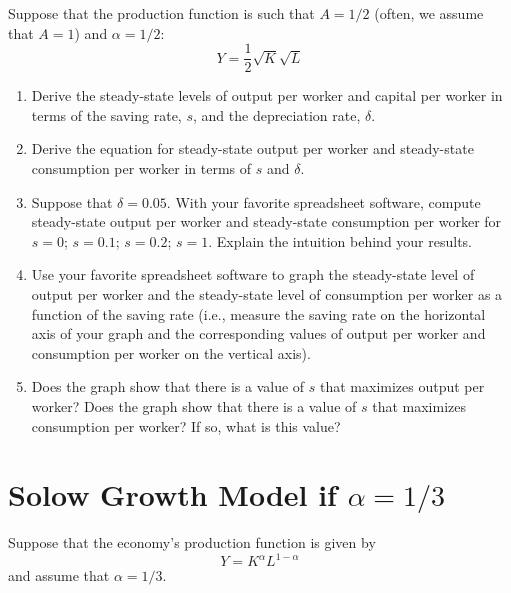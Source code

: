 \documentclass[]{book}
\begin{document}
Suppose that the production function is such that \(A=1/2\) (often, we
assume that \(A=1\)) and \(\alpha=1/2\):
\[Y=\frac{1}{2}\sqrt{K}\sqrt{L}\]

\begin{enumerate}
\def\labelenumi{\arabic{enumi}.}
\item
  Derive the steady-state levels of output per worker and capital per
  worker in terms of the saving rate, \(s\), and the depreciation rate,
  \(\delta\).
\item
  Derive the equation for steady-state output per worker and
  steady-state consumption per worker in terms of \(s\) and \(\delta\).
\item
  Suppose that \(\delta=0.05\). With your favorite spreadsheet software,
  compute steady-state output per worker and steady-state consumption
  per worker for \(s=0\); \(s=0.1\); \(s=0.2\); \(s=1\). Explain the
  intuition behind your results.
\item
  Use your favorite spreadsheet software to graph the steady-state level
  of output per worker and the steady-state level of consumption per
  worker as a function of the saving rate (i.e., measure the saving rate
  on the horizontal axis of your graph and the corresponding values of
  output per worker and consumption per worker on the vertical axis).
\item
  Does the graph show that there is a value of \(s\) that maximizes
  output per worker? Does the graph show that there is a value of \(s\)
  that maximizes consumption per worker? If so, what is this value?
\end{enumerate}

\section{\texorpdfstring{Solow Growth Model if
\(\alpha = 1/3\)}{Solow Growth Model if \textbackslash{}alpha = 1/3}}\label{solow-growth-model-if-alpha-13}

Suppose that the economy's production function is given by
\[Y=K^{\alpha}L^{1-\alpha}\] and assume that \(\alpha=1/3\).
\end{document}
